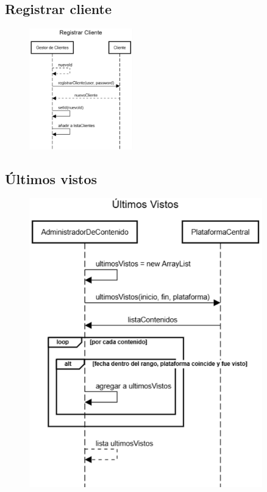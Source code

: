 \subsection{Registrar cliente}\label{subsec:registrar-cliente}
\begin{figure}[h]
    \centering
    \includegraphics[width=0.4\textwidth]{img/registrar}
\end{figure}

\clearpage

\subsection{Últimos vistos}\label{subsec:ultimos-vistos}
\begin{figure}[h]
    \centering
    \includegraphics[width=0.9\textwidth]{img/ultimos_vistos}
\end{figure}

